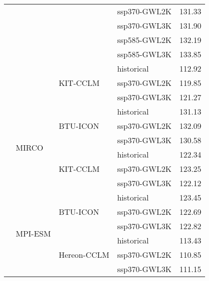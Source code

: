 \begin{table}[!htbp]
{\begin{tabular}{lll|l|r}
 &  &  & ssp370-GWL2K & 131.33 \\
 &  &  & ssp370-GWL3K & 131.90 \\
 &  &  & ssp585-GWL2K & 132.19 \\
 &  &  & ssp585-GWL3K & 133.85 \\
\cmidrule(lr){3-5}
 &  & \multirow{3}{*}{KIT-CCLM} & historical & 112.92 \\
 &  &  & ssp370-GWL2K & 119.85 \\
 &  &  & ssp370-GWL3K & 121.27 \\
\cmidrule(lr){3-5}
\cmidrule(lr){2-5}
 & \multirow{6}{*}{MIRCO} & \multirow{3}{*}{BTU-ICON} & historical & 131.13 \\
 &  &  & ssp370-GWL2K & 132.09 \\
 &  &  & ssp370-GWL3K & 130.58 \\
\cmidrule(lr){3-5}
 &  & \multirow{3}{*}{KIT-CCLM} & historical & 122.34 \\
 &  &  & ssp370-GWL2K & 123.25 \\
 &  &  & ssp370-GWL3K & 122.12 \\
\cmidrule(lr){3-5}
\cmidrule(lr){2-5}
 & \multirow{6}{*}{MPI-ESM} & \multirow{3}{*}{BTU-ICON} & historical & 123.45 \\
 &  &  & ssp370-GWL2K & 122.69 \\
 &  &  & ssp370-GWL3K & 122.82 \\
\cmidrule(lr){3-5}
 &  & \multirow{3}{*}{Hereon-CCLM} & historical & 113.43 \\
 &  &  & ssp370-GWL2K & 110.85 \\
 &  &  & ssp370-GWL3K & 111.15 \\
\bottomrule
\end{tabular}
}
\end{table}
